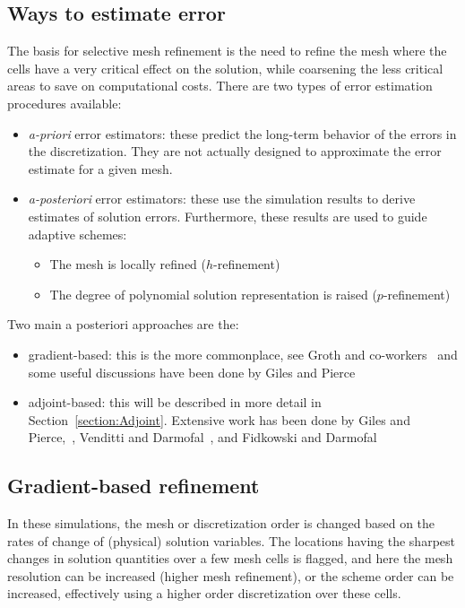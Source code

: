 \subsection{Ways to estimate error}
The basis for selective mesh refinement is the need to refine the mesh where the cells have a very critical effect on the solution, while coarsening the less critical areas to save on computational costs. There are two types of error estimation procedures available:
\begin{itemize}
\item \textit{a-priori} error estimators: these predict the long-term behavior of the errors in the discretization. They are not actually designed to approximate the error estimate for a given mesh. 
\item \textit{a-posteriori} error estimators: these use the simulation results to derive estimates of solution errors. Furthermore, these results are used to guide adaptive schemes:
\begin{itemize}
\item The mesh is locally refined ($h$-refinement) 
\item The degree of polynomial solution representation is raised ($p$-refinement)
\end{itemize}
\end{itemize}
Two main a posteriori approaches are the:
\begin{itemize}
\item gradient-based: this is the more commonplace, see Groth and co-workers~\cite{Groth:1999, williamschen:2013a, zhang:2011b, Freret:2015, northrup:2005} and some useful discussions have been done by Giles and Pierce~\cite{Giles:2000}
\item adjoint-based: this will be described in more detail in Section~\ref{section:Adjoint}. Extensive work has been done by Giles and Pierce,~\cite{Giles:2000}, Venditti and Darmofal~\cite{Venditti:2000, Venditti:2002, Venditti:2003}, and Fidkowski and Darmofal~\cite{Fidkowski:2011} 
\end{itemize}


\subsection{Gradient-based refinement}

In these simulations, the mesh or discretization order is changed based on the rates of change of (physical) solution variables. The locations having the sharpest changes in solution quantities over a few mesh cells is flagged, and here the mesh resolution can be increased (higher mesh refinement), or the scheme order can be increased, effectively using a higher order discretization over these cells.

